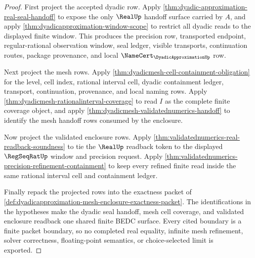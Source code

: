 \begin{proof}
First project the accepted dyadic row. Apply
\autoref{thm:dyadic-approximation-real-seal-handoff} to expose the only
$\RealUp$ handoff surface carried by $A$, and apply
\autoref{thm:dyadicapproximation-window-scope} to restrict all dyadic reads to
the displayed finite window. This produces the precision row, transported
endpoint, regular-rational observation window, seal ledger, visible
transports, continuation routes, package provenance, and local
$\NameCert_{\DyadicApproximationUp}$ row.

Next project the mesh rows. Apply
\autoref{thm:dyadicmesh-cell-containment-obligation} for the level, cell index,
rational interval cell, dyadic containment ledger, transport, continuation,
provenance, and local naming rows. Apply
\autoref{thm:dyadicmesh-rationalinterval-coverage} to read $I$ as the complete
finite coverage object, and apply
\autoref{thm:dyadicmesh-validatednumerics-handoff} to identify the mesh
handoff rows consumed by the enclosure.

Now project the validated enclosure rows. Apply
\autoref{thm:validatednumerics-real-readback-soundness} to tie the
$\RealUp$ readback token to the displayed $\RegSeqRatUp$ window and precision
request. Apply
\autoref{thm:validatednumerics-precision-refinement-containment} to keep every
refined finite read inside the same rational interval cell and containment
ledger.

Finally repack the projected rows into the exactness packet of
\autoref{def:dyadicapproximation-mesh-enclosure-exactness-packet}. The
identifications in the hypotheses make the dyadic seal handoff, mesh cell
coverage, and validated enclosure readback one shared finite BEDC surface.
Every cited boundary is a finite packet boundary, so no completed real
equality, infinite mesh refinement, solver correctness, floating-point
semantics, or choice-selected limit is exported.
\end{proof}
